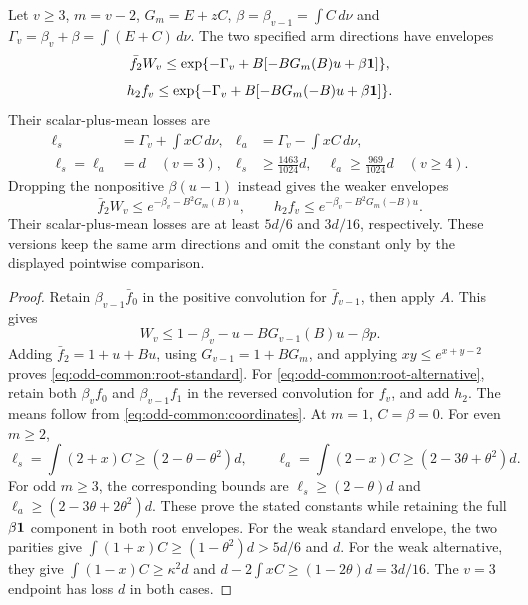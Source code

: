 \begin{lemma}
\label{lem:odd-common:root-pairs}
Let \(v\ge3\), \(m=v-2\), \(G_m=E+zC\),
\(\beta=\beta_{v-1}=\int C\,d\nu\) and
\(\Gamma_v=\beta_v+\beta=\int(E+C)\,d\nu\).
The two specified arm directions have envelopes
\begin{equation}\label{eq:odd-common:root-standard}
 \bar f_2W_v\le
 \exp\{-\Gamma_v+B[-BG_m(B)u+\beta\mathbf1]\},
\end{equation}
\begin{equation}\label{eq:odd-common:root-alternative}
 h_2f_v\le
 \exp\{-\Gamma_v+B[-BG_m(-B)u+\beta\mathbf1]\}.
\end{equation}
Their scalar-plus-mean losses are
\begin{equation}\label{eq:odd-common:root-losses}
\begin{aligned}
 \ell_s&=\Gamma_v+\int xC\,d\nu,&
 \ell_a&=\Gamma_v-\int xC\,d\nu,\\
 \ell_s=\ell_a&=d\quad(v=3),&
 \ell_s&\ge\tfrac{1463}{1024}d,\quad
 \ell_a\ge\tfrac{969}{1024}d\quad(v\ge4).
\end{aligned}
\end{equation}
Dropping the nonpositive \(\beta(u-1)\) instead gives the weaker
envelopes
\begin{equation}\label{eq:odd-common:root-weak}
 \bar f_2W_v\le e^{-\beta_v-B^2G_m(B)u},\qquad
 h_2f_v\le e^{-\beta_v-B^2G_m(-B)u}.
\end{equation}
Their scalar-plus-mean losses are at least \(5d/6\) and \(3d/16\),
respectively. These versions keep the same arm directions and omit
the constant only by the displayed pointwise comparison.
\end{lemma}
\begin{proof}
Retain \(\beta_{v-1}\bar f_0\) in the positive convolution for
\(\bar f_{v-1}\), then apply \(A\). This gives
\[
 W_v\le1-\beta_v-u-BG_{v-1}(B)u-\beta p.
\]
Adding \(\bar f_2=1+u+Bu\), using
\(G_{v-1}=1+BG_m\), and applying \(xy\le e^{x+y-2}\)
proves \eqref{eq:odd-common:root-standard}.
For \eqref{eq:odd-common:root-alternative}, retain both
\(\beta_vf_0\) and \(\beta_{v-1}f_1\) in the reversed convolution
for \(f_v\), and add \(h_2\).
The means follow from \eqref{eq:odd-common:coordinates}.
At \(m=1\), \(C=\beta=0\). For even \(m\ge2\),
\[
 \ell_s=\int(2+x)C\ge(2-\theta-\theta^2)d,
 \qquad
 \ell_a=\int(2-x)C\ge(2-3\theta+\theta^2)d.
\]
For odd \(m\ge3\), the corresponding bounds are
\(\ell_s\ge(2-\theta)d\) and
\(\ell_a\ge(2-3\theta+2\theta^2)d\).
These prove the stated constants while retaining the full
\(\beta\mathbf1\) component in both root envelopes.
For the weak standard envelope, the two parities give
\(\int(1+x)C\ge(1-\theta^2)d>5d/6\) and \(d\).
For the weak alternative, they give
\(\int(1-x)C\ge\kappa^2d\) and
\(d-2\int xC\ge(1-2\theta)d=3d/16\).
The \(v=3\) endpoint has loss \(d\) in both cases.
\end{proof}

